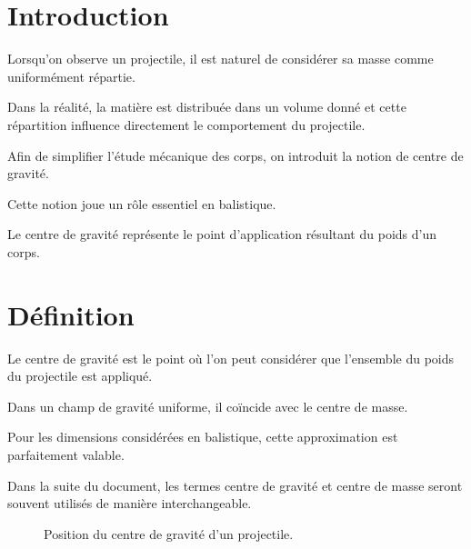 
\section{Introduction}

Lorsqu'on observe un projectile, il est naturel de considérer sa masse comme
uniformément répartie.

Dans la réalité, la matière est distribuée dans un volume donné et cette
répartition influence directement le comportement du projectile.

Afin de simplifier l'étude mécanique des corps, on introduit la notion de
centre de gravité.

Cette notion joue un rôle essentiel en balistique.

\begin{aretenir}

Le centre de gravité représente le point d'application résultant du poids
d'un corps.

\end{aretenir}

\section{Définition}

Le centre de gravité est le point où l'on peut considérer que l'ensemble du
poids du projectile est appliqué.

Dans un champ de gravité uniforme, il coïncide avec le centre de masse.

Pour les dimensions considérées en balistique, cette approximation est
parfaitement valable.

Dans la suite du document, les termes centre de gravité et centre de masse
seront souvent utilisés de manière interchangeable.

\begin{figure}[htbp]
\centering
{}
\caption{Position du centre de gravité d'un projectile.}
\label{fig:centre_gravite}
\end{figure}


